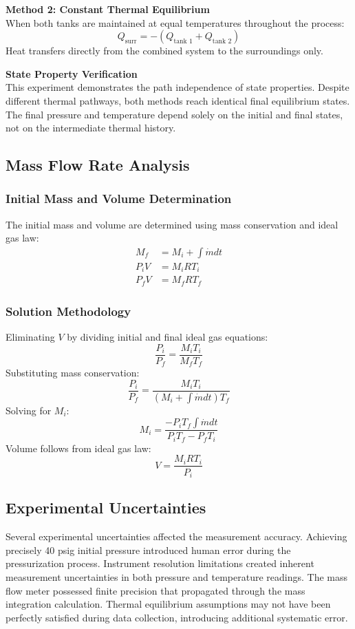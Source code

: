 \documentclass{article} %
\begin{document}
\begin{multicols}{2}
\textbf{Method 2: Constant Thermal Equilibrium}\\
When both tanks are maintained at equal temperatures throughout the process:
\[
Q_{\text{surr}} = -(Q_{\text{tank 1}} + Q_{\text{tank 2}})
\]
Heat transfers directly from the combined system to the surroundings only.

\textbf{State Property Verification}\\
This experiment demonstrates the path independence of state properties. Despite different thermal pathways, both methods reach identical final equilibrium states. The final pressure and temperature depend solely on the initial and final states, not on the intermediate thermal history.

\subsection{Mass Flow Rate Analysis}

\subsubsection{Initial Mass and Volume Determination}
The initial mass and volume are determined using mass conservation and ideal gas law:
\begin{align}
M_f &= M_i + \int \dot{m}  dt \label{eq:mass_cons} \\
P_i V &= M_i R T_i \label{eq:ig_init} \\
P_f V &= M_f R T_f \label{eq:ig_final}
\end{align}

\subsubsection{Solution Methodology}
Eliminating $V$ by dividing initial and final ideal gas equations:
\[
\frac{P_i}{P_f} = \frac{M_i T_i}{M_f T_f}
\]
Substituting mass conservation:
\[
\frac{P_i}{P_f} = \frac{M_i T_i}{(M_i + \int \dot{m}  dt) T_f}
\]
Solving for $M_i$:
\[
\boxed{M_i = \frac{-P_i T_f \int \dot{m}  dt}{P_i T_f - P_f T_i}}
\]
Volume follows from ideal gas law:
\[
V = \frac{M_i R T_i}{P_i}
\]

\subsection{Experimental Uncertainties}
Several experimental uncertainties affected the measurement accuracy. Achieving precisely 40 psig initial pressure introduced human error during the pressurization process. Instrument resolution limitations created inherent measurement uncertainties in both pressure and temperature readings. The mass flow meter possessed finite precision that propagated through the mass integration calculation. Thermal equilibrium assumptions may not have been perfectly satisfied during data collection, introducing additional systematic error.


\end{multicols}
\end{document}
